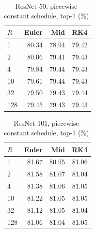 \begin{table}[t]
    \centering
    \caption{ResNet-50, piecewise-constant schedule, top-1 (\%).}
    \label{tab:app-r50}
    \setlength{\tabcolsep}{4pt}
    \begin{tabular}{lrrr}
        \toprule
        $R$ & Euler & Mid & RK4 \\
        \midrule
        1   & 80.34 & 78.94 & 79.42 \\
        2   & 80.06 & 79.41 & 79.43 \\
        4   & 79.84 & 79.44 & 79.43 \\
        10  & 79.61 & 79.44 & 79.43 \\
        32  & 79.50 & 79.43 & 79.44 \\
        128 & 79.45 & 79.43 & 79.43 \\
        \bottomrule
    \end{tabular}
\end{table}

\begin{table}[t]
    \centering
    \caption{ResNet-101, piecewise-constant schedule, top-1 (\%).}
    \label{tab:app-r101}
    \setlength{\tabcolsep}{4pt}
    \begin{tabular}{lrrr}
        \toprule
        $R$ & Euler & Mid & RK4 \\
        \midrule
        1   & 81.67 & 80.95 & 81.06 \\
        2   & 81.58 & 81.07 & 81.04 \\
        4   & 81.38 & 81.06 & 81.05 \\
        10  & 81.22 & 81.05 & 81.05 \\
        32  & 81.12 & 81.05 & 81.04 \\
        128 & 81.06 & 81.04 & 81.05 \\
        \bottomrule
    \end{tabular}
\end{table}

